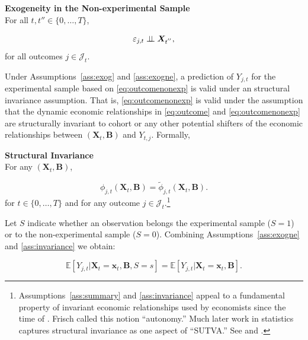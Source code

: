 \begin{assumption}\label{ass:exogne} \textbf{Exogeneity in the Non-experimental Sample}\\
For all $t, t'' \in \{ 0, \ldots, T \}$,

\begin{equation}
\varepsilon_{j,t} \perp\!\!\!\perp \bm{X}_{t^{''}},
\end{equation}
\noindent for all outcomes $j \in \mathcal{J}_{t}$.
\end{assumption}

\noindent Under Assumptions~\ref{ass:exog} and \ref{ass:exogne}, a prediction of $Y_{j,t}$ for the experimental sample based on \eqref{eq:outcomenonexp} is valid under an structural invariance assumption. That is, \eqref{eq:outcomenonexp} is valid under the assumption that the dynamic economic relationships in \eqref{eq:outcome} and \eqref{eq:outcomenonexp} are structurally invariant to cohort or any other potential shifters of the economic relationships between $\left( \bm{X}_{t}, \bm{B} \right)$ and $Y_{t,j}$. Formally, 

\onehalfspacing
\begin{assumption} \textbf{Structural Invariance} \label{ass:invariance} \\
\noindent For any  $\left( \bm{X}_{t}, \bm{B} \right)$,

\begin{equation}
\phi_{j,t} \left( \bm{X}_{t}, \bm{B} \right) = \widetilde{\phi}_{j,t} \left( \bm{X}_{t}, \bm{B} \right).
\end{equation}
\noindent for $t \in \{ 0, \ldots, T \}$ and for any outcome $j \in \mathcal{J}_{t}$.\footnote{Assumptions~\ref{ass:summary} and \ref{ass:invariance} appeal to a fundamental property of invariant economic relationships used by economists since the time of \citet{Frisch_1938_autonomy}. Frisch called this notion ``autonomy.'' Much later work in statistics captures structural invariance as one aspect of ``SUTVA.'' See \citet{Holland_1986_JASA} and \citet{Heckman_2008_ISR}.}
\end{assumption}
\doublespacing

\noindent Let $S$ indicate whether an observation belongs the experimental sample ($S = 1$) or to the non-experimental sample ($S = 0$). Combining Assumptions~\ref{ass:exogne} and \ref{ass:invariance} we obtain: 

\begin{equation}
\mathbb{E} \left[ Y_{j,t} | \bm{X}_{t} = \bm{x}_{t}, \bm{B}, S = s \right] = \mathbb{E} \left[ Y_{j,t} | \bm{X}_{t} = \bm{x}_{t}, \bm{B} \right]. \label{eq:withbetimplication}
\end{equation}

